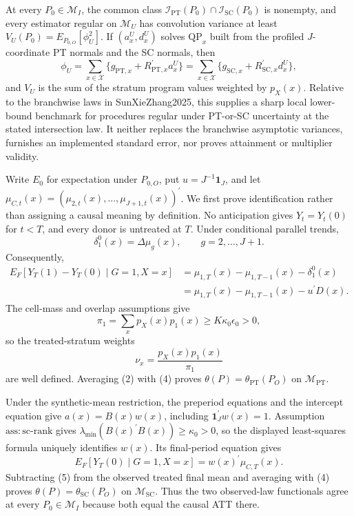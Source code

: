 At every \(P_0\in\mathcal M_I\), the common class \(\mathcal I_{\mathrm{PT}}(P_0)\cap\mathcal I_{\mathrm{SC}}(P_0)\) is nonempty, and every estimator regular on \(\mathcal M_U\) has convolution variance at least \(V_U(P_0)=E_{P_{0,O}}[\phi_U^2]\). If \((a_x^U,d_x^U)\) solves \(\mathrm{QP}_x\) built from the profiled \(J\)-coordinate PT normals and the SC normals, then
\[
 \phi_U=\sum_{x\in\mathcal X}\{g_{\mathrm{PT},x}+R_{\mathrm{PT},x}^{\prime}a_x^U\}
 =\sum_{x\in\mathcal X}\{g_{\mathrm{SC},x}+R_{\mathrm{SC},x}^{\prime}d_x^U\},
\]
and \(V_U\) is the sum of the stratum program values weighted by \(p_X(x)\). Relative to the branchwise laws in SunXieZhang2025, this supplies a sharp local lower-bound benchmark for procedures regular under PT-or-SC uncertainty at the stated intersection law. It neither replaces the branchwise asymptotic variances, furnishes an implemented standard error, nor proves attainment or multiplier validity.

Write \(E_0\) for expectation under \(P_{0,O}\), put \(u=J^{-1}\mathbf 1_J\), and let \(\mu_{C,t}(x)=(\mu_{2,t}(x),\ldots,\mu_{J+1,t}(x))^{\prime}\). We first prove identification rather than assigning a causal meaning by definition. No anticipation gives \(Y_t=Y_t(0)\) for \(t<T\), and every donor is untreated at \(T\). Under conditional parallel trends,
\[
 \delta_1^0(x)=\Delta\mu_g(x),
 \qquad g=2,\ldots,J+1.
 \tag{1}
\]
Consequently,
\[
 \begin{aligned}
 E_F[Y_T(1)-Y_T(0)\mid G=1,X=x]
 &=\mu_{1,T}(x)-\mu_{1,T-1}(x)-\delta_1^0(x)\\
 &=\mu_{1,T}(x)-\mu_{1,T-1}(x)-u^{\prime}D(x).
 \end{aligned}
 \tag{2}
\]
The cell-mass and overlap assumptions give
\[
 \pi_1=\sum_xp_X(x)p_1(x)\ge K\kappa_0\epsilon_0>0,
 \tag{3}
\]
so the treated-stratum weights
\[
 \nu_x=\frac{p_X(x)p_1(x)}{\pi_1}
 \tag{4}
\]
are well defined. Averaging (2) with (4) proves \(\theta(P)=\theta_{\mathrm{PT}}(P_O)\) on \(\mathcal M_{\mathrm{PT}}\).

Under the synthetic-mean restriction, the preperiod equations and the intercept equation give \(a(x)=B(x)w(x)\), including \(\mathbf 1_J^{\prime}w(x)=1\). Assumption \(\mathrm{ass{:}sc\text{-}rank}\) gives \(\lambda_{\min}(B(x)^{\prime}B(x))\ge\kappa_0>0\), so the displayed least-squares formula uniquely identifies \(w(x)\). Its final-period equation gives
\[
 E_F[Y_T(0)\mid G=1,X=x]=w(x)^{\prime}\mu_{C,T}(x).
 \tag{5}
\]
Subtracting (5) from the observed treated final mean and averaging with (4) proves \(\theta(P)=\theta_{\mathrm{SC}}(P_O)\) on \(\mathcal M_{\mathrm{SC}}\). Thus the two observed-law functionals agree at every \(P_0\in\mathcal M_I\) because both equal the causal ATT there.

